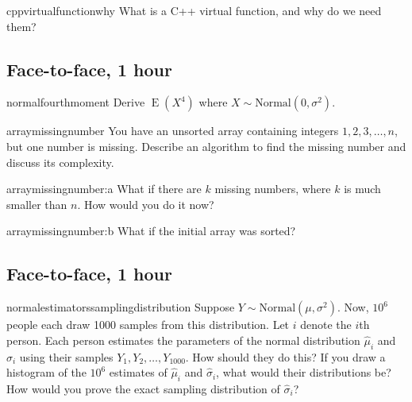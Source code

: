 \documentclass[a4paper]{article}
\begin{document}
\begin{question}{cppvirtualfunctionwhy}
What is a C++ virtual function, and why do we need them?
\end{question}

\clearpage








\clearpage
\subsection{Face-to-face, 1 hour}
\begin{question}{normalfourthmoment}
Derive $\operatorname{E}(X^4)$ where $X \sim \text{Normal}\left(0, \sigma^2\right)$.
\end{question}


\begin{question}{arraymissingnumber}
You have an unsorted array containing integers $1,2,3, \ldots, n$, but one number is missing.
Describe an algorithm to find the missing number and discuss its complexity.
\end{question}


\begin{subquestion}{arraymissingnumber:a}
What if there are $k$ missing numbers, where $k$ is much smaller than $n$.
How would you do it now?
\end{subquestion}


\begin{subquestion}{arraymissingnumber:b}
What if the initial array was sorted?
\end{subquestion}


\clearpage






\clearpage
\subsection{Face-to-face, 1 hour}
\begin{question}{normalestimatorssamplingdistribution}
Suppose
$Y \sim \text{Normal}(\mu, \sigma^2)$.
Now, $10^6$ people each draw 1000 samples from this distribution.
Let $i$ denote the $i$th person.
Each person estimates the parameters of the normal distribution
$\hat{\mu}_i$
and
$\hat{\sigma}_i$
using their samples
$Y_1, Y_2, \ldots , Y_{1000}$.
How should they do this?
If you draw a histogram of the $10^6$ estimates of
$\hat{\mu}_i$ and $\hat{\sigma}_i$, what would their distributions be?
How would you prove the exact sampling distribution of $\hat{\sigma}_i$?
\end{question}
\end{document}

